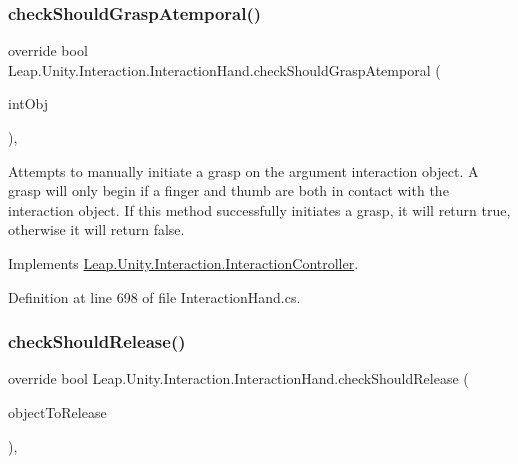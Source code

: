 \subsubsection{\texorpdfstring{checkShouldGraspAtemporal()}{checkShouldGraspAtemporal()}}
{\footnotesize\ttfamily override bool Leap.\+Unity.\+Interaction.\+Interaction\+Hand.\+check\+Should\+Grasp\+Atemporal (\begin{DoxyParamCaption}\item[{\mbox{\hyperlink{interface_leap_1_1_unity_1_1_interaction_1_1_i_interaction_behaviour}{I\+Interaction\+Behaviour}}}]{int\+Obj }\end{DoxyParamCaption})\hspace{0.3cm}{\ttfamily [protected]}, {\ttfamily [virtual]}}



Attempts to manually initiate a grasp on the argument interaction object. A grasp will only begin if a finger and thumb are both in contact with the interaction object. If this method successfully initiates a grasp, it will return true, otherwise it will return false. 



Implements \mbox{\hyperlink{class_leap_1_1_unity_1_1_interaction_1_1_interaction_controller_a99f071b469073deb8265da627e90ad0c}{Leap.\+Unity.\+Interaction.\+Interaction\+Controller}}.



Definition at line 698 of file Interaction\+Hand.\+cs.

\mbox{\label{class_leap_1_1_unity_1_1_interaction_1_1_interaction_hand_aaf0c4bf5f6892517ac5be576104550b4}} 
\subsubsection{\texorpdfstring{checkShouldRelease()}{checkShouldRelease()}}
{\footnotesize\ttfamily override bool Leap.\+Unity.\+Interaction.\+Interaction\+Hand.\+check\+Should\+Release (\begin{DoxyParamCaption}\item[{out \mbox{\hyperlink{interface_leap_1_1_unity_1_1_interaction_1_1_i_interaction_behaviour}{I\+Interaction\+Behaviour}}}]{object\+To\+Release }\end{DoxyParamCaption})\hspace{0.3cm}{\ttfamily [protected]}, {\ttfamily [virtual]}}



